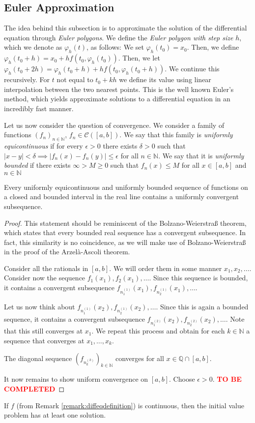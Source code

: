 \documentclass[prb,12pt]{revtex4-2}
\theoremstyle{definition}
\theoremstyle{definition}
\theoremstyle{definition}
\newcommand{\N}{\mathbb{N}}
\newcommand{\Q}{\mathbb{Q}}
\begin{document}
	\subsection{Euler Approximation}
	The idea behind this subsection is to approximate the solution of the differential equation through \emph{Euler polygons}. We define the \emph{Euler polygon with step size} $h$, which we denote as $\varphi_h(t)$, as follows: We set $\varphi_h(t_0) = x_0$. Then, we define $\varphi_h(t_0+h)=x_0 + hf(t_0, \varphi_h(t_0))$. Then, we let $\varphi_h(t_0 + 2h)= \varphi_h(t_0+h)+hf(t_0, \varphi_h(t_0+h))$. We continue this recursively. For $t$ not equal to $t_0+kh$ we define its value using linear interpolation between the two nearest points. This is the well known Euler's method, which yields approximate solutions to a differential equation in an incredibly fast manner.
	
	Let us now consider the question of convergence. We consider a family of functions $(f_n)_{n\in \N}$, $f_n\in \mathcal{C}([a,b])$. We say that this family is \emph{uniformly equicontinuous} if for every $\epsilon>0$ there exists $\delta>0$ such that $|x-y|<\delta\implies |f_n(x)-f_n(y)|\le \epsilon$ for all $n\in \N$. We say that it is \emph{uniformly bounded} if there exists $\infty>M\ge 0$ such that $f_n(x)\le M$ for all $x\in [a,b]$ and $n\in \N$
	\begin{Theorem}
		Every uniformly equicontinuous and uniformly bounded sequence of functions on a closed and bounded interval in the real line contains a uniformly convergent subsequence.
	\end{Theorem}
	\begin{proof}
		This statement should be reminiscent of the Bolzano-Weierstraß theorem, which states that every bounded real sequence has a convergent subsequence. In fact, this similarity is no coincidence, as we will make use of Bolzano-Weierstraß in the proof of the Arzelà-Ascoli theorem.
		
		Consider all the rationals in $[a,b]$. We will order them in some manner $x_1, x_2, \dots$. Consider now the sequence $f_1(x_1), f_2(x_1), \dots$. Since this sequence is bounded, it contains a convergent subsequence $f_{n^{(1)}_1}(x_1), f_{n^{(1)}_2}(x_1), \dots$.
		
		Let us now think about $f_{n^{(1)}_1}(x_2), f_{n^{(1)}_2}(x_2), \dots$. Since this is again a bounded sequence, it contains a convergent subsequence $f_{n^{(2)}_1}(x_2), f_{n^{(2)}_2}(x_2), \dots$. Note that this still converges at $x_1$. We repeat this process and obtain for each $k\in \N$ a sequence that converges at $x_1, \dots, x_k$. 
		
		The diagonal sequence $(f_{n^{(k)}_k})_{k\in \N}$ converges for all $x\in \Q\cap [a,b]$.
		
		It now remains to show uniform convergence on $[a,b]$. Choose $\epsilon>0$. \textcolor{red}{\textbf{TO BE COMPLETED}}
	\end{proof}
	\begin{Theorem}[Peano]
If $f$ (from Remark \ref{remark:diffeqdefinition}) is continuous, then the initial value problem has at least one solution.
	\end{Theorem}
\end{document}
